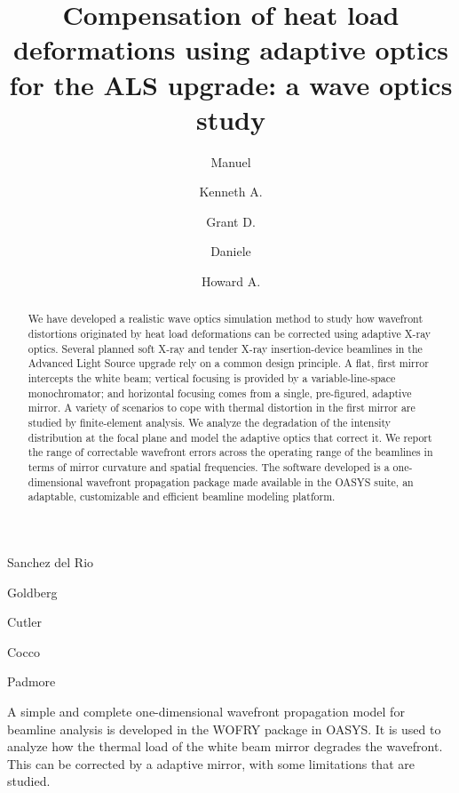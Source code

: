 \documentclass{iucr}
\begin{document}

\title{Compensation of heat load deformations using adaptive optics for the ALS upgrade: a wave optics study}



\author[a]{Manuel}{Sanchez del Rio}
\author[a]{Kenneth A.}{Goldberg}
\author[a]{Grant D.}{Cutler}
\author[a]{Daniele}{Cocco}
\author[a]{Howard A.}{Padmore}

 
\maketitle

\begin{synopsis}
A simple and complete one-dimensional wavefront propagation model for beamline analysis is developed in the WOFRY package in OASYS. It is used to analyze how the thermal load of the white beam mirror degrades the wavefront. This can be corrected by a adaptive mirror, with some limitations that are studied.
\end{synopsis}

\begin{abstract}
We have developed a realistic wave optics simulation method to study how wavefront distortions originated by heat load deformations can be corrected using adaptive X-ray optics. Several planned soft X-ray and tender X-ray insertion-device beamlines in the Advanced Light Source upgrade rely on a common design principle. A flat, first mirror intercepts the white beam; vertical focusing is provided by a variable-line-space monochromator; and horizontal focusing comes from a single, pre-figured, adaptive mirror. 
A variety of scenarios to cope with thermal distortion in the first mirror are studied by finite-element analysis. We analyze the degradation of the intensity distribution at the focal plane and model the adaptive optics that correct it. We report the range of correctable wavefront errors across the operating range of the beamlines in terms of mirror curvature and spatial frequencies. The software developed is a one-dimensional wavefront propagation package made available in the OASYS suite, an adaptable, customizable and efficient beamline modeling platform.
\end{abstract}
\end{document}
